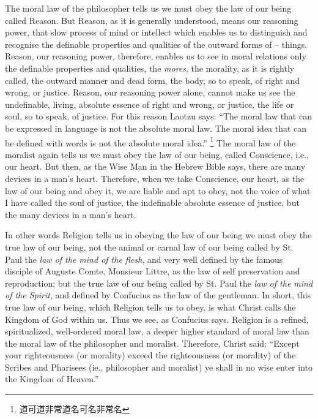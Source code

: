 The moral law of the philosopher tells us we must obey the law of our being called Reason.
But Reason, as it is generally understood, means our reasoning power, that slow process of mind or intellect which enables us to distinguish and recognise the definable properties and qualities of the outward forms of  --  things.
Reason, our reasoning power, therefore, enables us to see in moral relations only the definable properties and qualities, the \emph{mores}, the morality, as it is rightly called, the outward manner and dead form, the body, so to speak, of right and wrong, or justice.
Reason, our reasoning power alone, cannot make us see the undefinable, living, absolute essence of right and wrong, or justice, the life or soul, so to speak, of justice.
For this reason Laotzu says: ``The moral law that can be expressed in language is not the absolute moral law.
The moral idea that can be defined with words is not the absolute moral idea.'' \footnote{道可道非常道名可名非常名}
The moral law of the moralist again tells us we must obey the law of our being, called Conscience, i.e., our heart.
But then, as the Wise Man in the Hebrew Bible says, there are many devices in a man's heart.
Therefore, when we take Conscience, our heart, as the law of our being and obey it,
we are liable and apt to obey, not the voice of what I have called the soul of justice,
the indefinable absolute essence of justice, but the many devices in a man's heart.

In other words Religion tells us in obeying the law of our being we must obey the true law of our being,
not the animal or carnal law of our being called by St. Paul the \emph{law of the mind of the flesh},
and very well defined by the famous disciple of Auguste Comte, Monsieur Littre, as the law of self preservation and reproduction; but the true law of our being called by St. Paul the \emph{law of the mind of the Spirit},
and defined by Confucius as the law of the gentleman.
In short, this true law of our being, which Religion tells us to obey,
is what Christ calls the Kingdom of God within us.
Thus we see, as Confucius says. Religion is a refined, spiritualized, well-ordered moral law,
a deeper higher standard of moral law than the moral law of the philosopher and moralist.
Therefore, Christ said:
``Except your righteousness (or morality) exceed the righteousness (or morality) of the Scribes and Pharisees (ie., philosopher and moralist) ye shall in no wise enter into the Kingdom of Heaven.''

